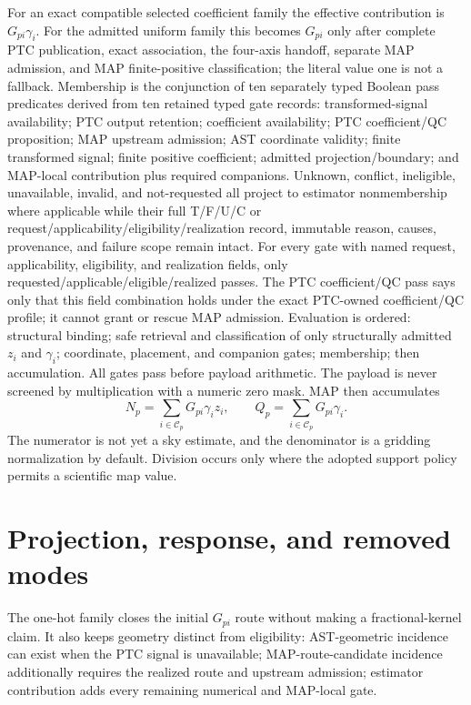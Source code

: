 \documentclass[10pt]{article}
\begin{document}
For an exact compatible selected coefficient family the effective contribution
is \(G_{pi}\gamma_i\). For the admitted uniform family this becomes
\(G_{pi}\) only after complete PTC publication, exact association, the
four-axis handoff, separate MAP admission, and MAP finite-positive
classification; the literal value one is not a fallback. Membership is the
conjunction of ten separately typed
Boolean pass predicates derived from ten retained typed gate records:
transformed-signal availability; PTC output retention; coefficient
availability; PTC coefficient/QC proposition; MAP upstream admission; AST
coordinate validity; finite transformed signal; finite positive coefficient;
admitted projection/boundary; and MAP-local contribution plus required
companions. Unknown, conflict, ineligible, unavailable, invalid, and
not-requested all project to estimator nonmembership where applicable while
their full T/F/U/C or request/applicability/eligibility/realization record,
immutable reason, causes, provenance, and failure scope remain intact. For
every gate with named request, applicability, eligibility, and realization
fields, only requested/applicable/eligible/realized passes. The PTC
coefficient/QC pass says only that this field combination holds under the exact
PTC-owned coefficient/QC profile; it cannot grant or rescue MAP admission.
Evaluation is ordered: structural binding; safe retrieval and classification
of only structurally admitted \(z_i\) and \(\gamma_i\); coordinate, placement,
and companion gates; membership; then accumulation. All gates pass before
payload arithmetic. The payload is never screened by multiplication with a
numeric zero mask. MAP then accumulates
\begin{equation}
 N_p=\sum_{i\in\mathcal C_p}G_{pi}\gamma_i z_i,\qquad
 Q_p=\sum_{i\in\mathcal C_p}G_{pi}\gamma_i.
\end{equation}
The numerator is not yet a sky estimate, and the denominator is a gridding
normalization by default. Division occurs only where the adopted support
policy permits a scientific map value.

\section{Projection, response, and removed modes}\label{sec:projection}
The one-hot family closes the initial \(G_{pi}\) route without making a
fractional-kernel claim. It also keeps geometry distinct from eligibility:
AST-geometric incidence can exist when the PTC signal is unavailable;
MAP-route-candidate incidence additionally requires the realized route and
upstream admission; estimator contribution adds every remaining numerical and
MAP-local gate.
\end{document}
